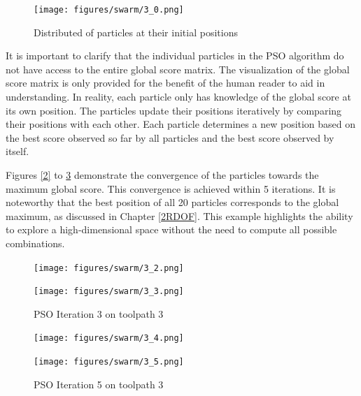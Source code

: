 \begin{figure}[H]
	\centerline{\texttt{[image: figures/swarm/3\_0.png]}}
	\caption{Distributed of particles at their initial positions}
	\label{PSO_1}
\end{figure}



It is important to clarify that the individual particles in the \acrshort{PSO} algorithm do not have access to the entire global score matrix. The visualization of the global score matrix is only provided for the benefit of the human reader to aid in understanding. In reality, each particle only has knowledge of the global score at its own position. The particles update their positions iteratively by comparing their positions with each other. Each particle determines a new position based on the best score observed so far by all particles and the best score observed by itself. 

Figures \ref{2} to \ref{5} demonstrate the convergence of the particles towards the maximum global score. This convergence is achieved within 5 iterations. It is noteworthy that the best position of all 20 particles corresponds to the global maximum, as discussed in Chapter \ref{2RDOF}. This example highlights the ability to explore a high-dimensional space without the need to compute all possible combinations.


\begin{figure}[H]
	\centering
	\begin{minipage}{0.5\textwidth}
		\texttt{[image: figures/swarm/3\_2.png]}
		\caption{PSO Iteration 2 on toolpath 3}
		\label{2}
	\end{minipage}\hfill
	\begin{minipage}{0.5\textwidth}
		\texttt{[image: figures/swarm/3\_3.png]}
		\caption{PSO Iteration 3 on toolpath 3}
		\label{3}
	\end{minipage}\par
\end{figure}	


\begin{figure}[H]	
		\centering
	\begin{minipage}{0.5\textwidth}
		\texttt{[image: figures/swarm/3\_4.png]}
		\caption{PSO Iteration 4 on toolpath 3}
		\label{4}
	\end{minipage}\hfill
	\begin{minipage}{0.5\textwidth}
		\texttt{[image: figures/swarm/3\_5.png]}
		\caption{PSO Iteration 5 on toolpath 3}
		\label{5}
	\end{minipage}\par
\end{figure}

